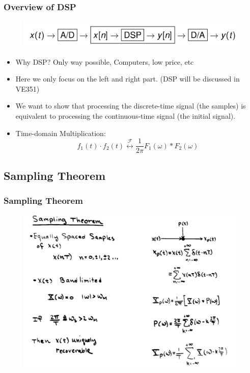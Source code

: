 \documentclass{beamer}
\begin{document}
\begin{frame}
    \frametitle{Overview of DSP}
    \begin{figure}
        \includegraphics[width=0.8\linewidth]{dsp}
    \end{figure}
    \begin{itemize}
        \item Why DSP? Only way possible, Computers, low price, etc 
        \item Here we only focus on the left and right part. (DSP will be discussed in VE351)
        \item We want to show that processing the discrete-time signal (the samples) is equivalent to processing the continuous-time signal (the initial signal).
        \item Time-domain Multiplication: \[f_1(t)\cdot f_2(t) \stackrel{\mathscr{F}}{\longleftrightarrow} \frac{1}{2 \pi} F_1(\omega) * F_2(\omega)    \]
    \end{itemize}
\end{frame}

\subsection{Sampling Theorem}



\begin{frame}
\frametitle{Sampling Theorem}
\begin{figure}
\includegraphics[width=0.8\linewidth]{sample1}
\end{figure}
\end{frame}
\end{document}
